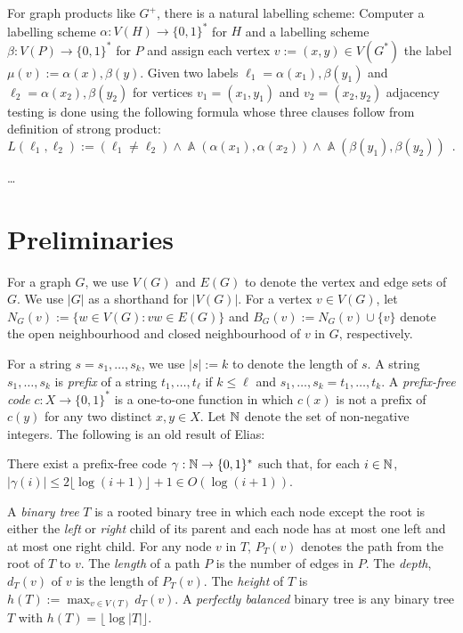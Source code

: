 \documentclass[kpfonts]{patmorin}
\DeclareMathOperator{\A}{\mathds{A}}
\begin{document}
For graph products like $G^+$, there is a natural labelling scheme: Computer a labelling scheme $\alpha:V(H)\to\{0,1\}^*$ for $H$ and a labelling scheme $\beta:V(P)\to\{0,1\}^*$ for $P$ and assign each vertex $v:=(x,y)\in V(G^*)$ the label $\mu(v):=\alpha(x),\beta(y)$.  Given two labels $\ell_1=\alpha(x_1),\beta(y_1)$ and $\ell_2=\alpha(x_2),\beta(y_2)$ for vertices $v_1=(x_1,y_1)$ and $v_2=(x_2,y_2)$ adjacency testing is done using the following formula whose three clauses follow from definition of strong product:
\[
    L(\ell_1,\ell_2):= (\ell_1\neq \ell_2) \wedge \A(\alpha(x_1),\alpha(x_2)) \wedge \A(\beta(y_1),\beta(y_2)) \enspace .
\]

\ldots



\section{Preliminaries}

For a graph $G$, we use $V(G)$ and $E(G)$ to denote the vertex and edge sets of $G$.  We use $|G|$ as a shorthand for $|V(G)|$. For a vertex $v\in V(G)$, let $N_G(v):=\{w\in V(G): vw\in E(G)\}$ and $B_G(v):=N_G(v)\cup\{v\}$ denote the open neighbourhood and closed neighbourhood of $v$ in $G$, respectively.

For a string $s=s_1,\ldots,s_k$, we use $|s|:=k$ to denote the length of $s$. A string $s_1,\ldots,s_k$ is \emph{prefix} of a string $t_1,\ldots,t_\ell$ if $k\le \ell$ and $s_1,\ldots,s_k=t_1,\ldots,t_k$.  A \emph{prefix-free code} $c:X\to\{0,1\}^*$ is a one-to-one function in which $c(x)$ is not a prefix of $c(y)$ for any two distinct $x,y\in X$.  Let $\mathbb{N}$ denote the set of non-negative integers.  The following is an old result of Elias:

\begin{lem}
    There exist a prefix-free code $\gamma:\mathbb{N}\to\{0,1\}^*$ such that, for each $i\in\mathbb{N}$, $|\gamma(i)|\le 2\lfloor\log(i+1)\rfloor + 1\in O(\log(i+1))$.
\end{lem}

A \emph{binary tree} $T$ is a rooted binary tree in which each node except the root is either the \emph{left} or \emph{right} child of its parent and each node has at most one left and at most one right child.  For any node $v$ in $T$, $P_T(v)$ denotes the path from the root of $T$ to $v$.  The \emph{length} of a path $P$ is the number of edges in $P$.  The \emph{depth}, $d_T(v)$ of $v$ is the length of $P_T(v)$.  The \emph{height} of $T$ is $h(T):=\max_{v\in V(T)} d_T(v)$.  A \emph{perfectly balanced} binary tree is any binary tree $T$ with $h(T)=\lfloor\log|T|\rfloor$.
\end{document}
